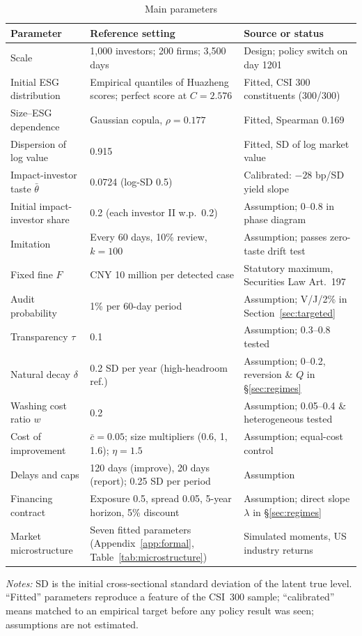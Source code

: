 \documentclass[11pt]{article}
\begin{document}
\begin{table}[t]
\centering
\small
\begin{threeparttable}
\caption{Main parameters}
\label{tab:parameters}
\begin{tabular}{@{}p{4.1cm}p{4.6cm}p{5.6cm}@{}}
\toprule
Parameter & Reference setting & Source or status \\
\midrule
Scale & 1,000 investors; 200 firms; 3,500 days & Design; policy switch on day 1201 \\
Initial ESG distribution & Empirical quantiles of Huazheng scores; perfect score at $C=2.576$ & Fitted, CSI 300 constituents (300/300) \\
Size--ESG dependence & Gaussian copula, $\rho = 0.177$ & Fitted, Spearman 0.169 \\
Dispersion of log value & 0.915 & Fitted, SD of log market value \\
Impact-investor taste $\bar\theta$ & 0.0724 (log-SD 0.5) & Calibrated: $-28$ bp/SD yield slope \\
Initial impact-investor share & 0.2 (each investor II w.p.\ 0.2) & Assumption; 0--0.8 in phase diagram \\
Imitation & Every 60 days, 10\% review, $k=100$ & Assumption; passes zero-taste drift test \\
Fixed fine $F$ & CNY 10 million per detected case & Statutory maximum, Securities Law Art.\ 197 \\
Audit probability & 1\% per 60-day period & Assumption; V/J/2\% in Section~\ref{sec:targeted} \\
Transparency $\tau$ & 0.1 & Assumption; 0.3--0.8 tested \\
Natural decay $\delta$ & 0.2 SD per year (high-headroom ref.) & Assumption; 0--0.2, reversion \& $Q$ in \S\ref{sec:regimes} \\
Washing cost ratio $w$ & 0.2 & Assumption; 0.05--0.4 \& heterogeneous tested \\
Cost of improvement & $\bar c = 0.05$; size multipliers (0.6, 1, 1.6); $\eta = 1.5$ & Assumption; equal-cost control \\
Delays and caps & 120 days (improve), 20 days (report); 0.25 SD per period & Assumption \\
Financing contract & Exposure 0.5, spread 0.05, 5-year horizon, 5\% discount & Assumption; direct slope $\lambda$ in \S\ref{sec:regimes} \\
Market microstructure & Seven fitted parameters (Appendix~\ref{app:formal}, Table~\ref{tab:microstructure}) & Simulated moments, US industry returns \\
\bottomrule
\end{tabular}
\begin{tablenotes}[flushleft]\footnotesize
\item \textit{Notes:} SD is the initial cross-sectional standard deviation of the latent true level. ``Fitted'' parameters reproduce a feature of the CSI~300 sample; ``calibrated'' means matched to an empirical target before any policy result was seen; assumptions are not estimated.
\end{tablenotes}
\end{threeparttable}
\end{table}
\end{document}
